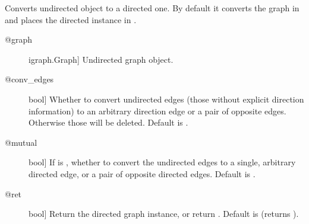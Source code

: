 \documentclass[letterpaper,10pt,english]{sphinxmanual}
\begin{document}
\begin{fulllineitems}
\begin{fulllineitems}
\end{fulllineitems}


\begin{fulllineitems}
\label{\detokenize{main:pypath.main.PyPath.genesymbols}}
\end{fulllineitems}


\begin{fulllineitems}
\label{\detokenize{main:pypath.main.PyPath.get_attrs}}
\end{fulllineitems}


\begin{fulllineitems}
\label{\detokenize{main:pypath.main.PyPath.get_directed}}
Converts  undirected  object to a directed one.
By default it converts the graph in  and places the directed
instance in .
\begin{description}
\item[{@graph}] \leavevmode{[}igraph.Graph{]}
Undirected graph object.

\item[{@conv\_edges}] \leavevmode{[}bool{]}
Whether to convert undirected edges (those without explicit
direction information) to an arbitrary direction edge or
a pair of opposite edges.
Otherwise those will be deleted. Default is .

\item[{@mutual}] \leavevmode{[}bool{]}
If  is , whether to convert the
undirected edges to a single, arbitrary directed edge,
or a pair of opposite directed edges. Default is .

\item[{@ret}] \leavevmode{[}bool{]}
Return the directed graph instance, or return .
Default is  (returns ).


\end{description}
\end{fulllineitems}
\end{fulllineitems}
\end{document}
